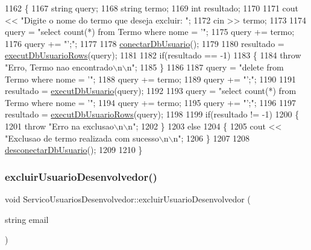 \begin{DoxyCode}
1162 \{
1167   \textcolor{keywordtype}{string} query;
1168   \textcolor{keywordtype}{string} termo;
1169   \textcolor{keywordtype}{int} resultado;
1170 
1171   cout << \textcolor{stringliteral}{"Digite o nome do termo que deseja excluir: "};
1172   cin >> termo;
1173 
1174   query = \textcolor{stringliteral}{"select count(*) from Termo where nome = '"};
1175   query += termo;
1176   query += \textcolor{stringliteral}{"';"};
1177 
1178   \mbox{\hyperlink{comando_sql_8cpp_a4f89ddcbc4cf8f2587d89f72f8c7900d}{conectarDbUsuario}}();
1179 
1180   resultado = \mbox{\hyperlink{comando_sql_8cpp_af54952694f2fa7d76f969fb74b853cb9}{executDbUsuarioRows}}(query);
1181 
1182   \textcolor{keywordflow}{if}(resultado == -1)
1183   \{
1184     \textcolor{keywordflow}{throw} \textcolor{stringliteral}{"Erro, Termo nao encontrado\(\backslash\)n\(\backslash\)n"};
1185   \}
1186 
1187   query = \textcolor{stringliteral}{"delete from Termo where nome = '"};
1188   query += termo;
1189   query += \textcolor{stringliteral}{"';"};
1190 
1191   resultado = \mbox{\hyperlink{comando_sql_8cpp_a748197580e7f9acdbf48c78de1f7924b}{executDbUsuario}}(query);
1192 
1193   query = \textcolor{stringliteral}{"select count(*) from Termo where nome = '"};
1194   query += termo;
1195   query += \textcolor{stringliteral}{"';"};
1196 
1197   resultado = \mbox{\hyperlink{comando_sql_8cpp_af54952694f2fa7d76f969fb74b853cb9}{executDbUsuarioRows}}(query);
1198 
1199   \textcolor{keywordflow}{if}(resultado != -1)
1200   \{
1201     \textcolor{keywordflow}{throw} \textcolor{stringliteral}{"Erro na exclusao\(\backslash\)n\(\backslash\)n"};
1202   \}
1203   \textcolor{keywordflow}{else}
1204   \{
1205     cout << \textcolor{stringliteral}{"Exclusao de termo realizada com sucesso\(\backslash\)n\(\backslash\)n"};
1206   \}
1207 
1208   \mbox{\hyperlink{comando_sql_8cpp_a969be9911913568e30d4ae8963338bc3}{desconectarDbUsuario}}();
1209 
1210 \}
\end{DoxyCode}
\mbox{\label{class_servico_usuarios_desenvolvedor_ad536645995beed517216ed96206ae018}} 
\subsubsection{\texorpdfstring{excluir\+Usuario\+Desenvolvedor()}{excluirUsuarioDesenvolvedor()}}
{\footnotesize\ttfamily void Servico\+Usuarios\+Desenvolvedor\+::excluir\+Usuario\+Desenvolvedor (\begin{DoxyParamCaption}\item[{string}]{email }\end{DoxyParamCaption})\hspace{0.3cm}{\ttfamily [virtual]}}

